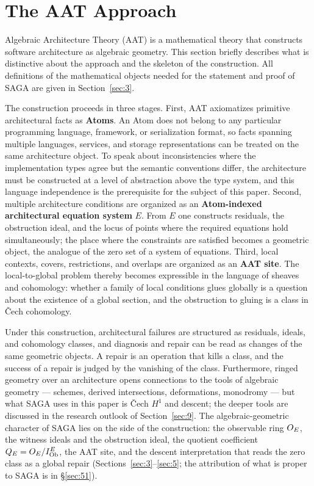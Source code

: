 \section{The AAT Approach}\label{sec:2}

Algebraic Architecture Theory (AAT) is a mathematical theory that
constructs software architecture as algebraic geometry. This section
briefly describes what is distinctive about the approach and the skeleton
of the construction. All definitions of the mathematical objects needed
for the statement and proof of SAGA are given in Section~\ref{sec:3}.

The construction proceeds in three stages. First, AAT axiomatizes
primitive architectural facts as \textbf{Atoms}. An Atom does not belong
to any particular programming language, framework, or serialization
format, so facts spanning multiple languages, services, and storage
representations can be treated on the same architecture object. To speak
about inconsistencies where the implementation types agree but the
semantic conventions differ, the architecture must be constructed at a
level of abstraction above the type system, and this language independence
is the prerequisite for the subject of this paper. Second, multiple
architecture conditions are organized as an \textbf{Atom-indexed
architectural equation system} $E$. From $E$ one constructs residuals,
the obstruction ideal, and the locus of points where the required
equations hold simultaneously; the place where the constraints are
satisfied becomes a geometric object, the analogue of the zero set of a
system of equations. Third, local contexts, covers, restrictions, and
overlaps are organized as an \textbf{AAT site}. The local-to-global
problem thereby becomes expressible in the language of sheaves and
cohomology: whether a family of local conditions glues globally is a
question about the existence of a global section, and the obstruction to
gluing is a class in \v{C}ech cohomology.

Under this construction, architectural failures are structured as
residuals, ideals, and cohomology classes, and diagnosis and repair can be
read as changes of the same geometric objects. A repair is an operation
that kills a class, and the success of a repair is judged by the vanishing
of the class. Furthermore, ringed geometry over an architecture opens
connections to the tools of algebraic geometry --- schemes, derived
intersections, deformations, monodromy --- but what SAGA uses in this
paper is \v{C}ech $H^1$ and descent; the deeper tools are discussed in the
research outlook of Section~\ref{sec:9}. The algebraic-geometric character
of SAGA lies on the side of the construction: the observable ring
$O_{E}$, the witness ideals and the obstruction ideal, the quotient
coefficient $Q_{E}=O_{E}/I_{\mathrm{Ob}}^{E}$, the AAT site, and the descent
interpretation that reads the zero class as a global repair
(Sections~\ref{sec:3}--\ref{sec:5}; the attribution of what is proper to
SAGA is in \S\ref{sec:51}).

